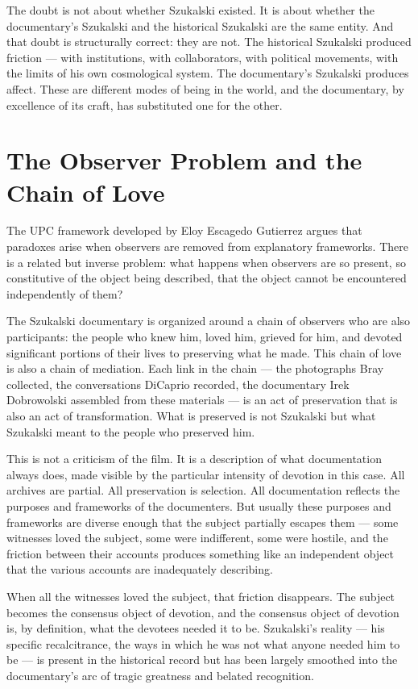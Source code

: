 \documentclass[11pt, a4paper]{article}
\theoremstyle{named}
\begin{document}
The doubt is not about whether Szukalski existed. It is about
whether the documentary's Szukalski and the historical Szukalski
are the same entity. And that doubt is structurally correct:
they are not. The historical Szukalski produced friction — with
institutions, with collaborators, with political movements, with
the limits of his own cosmological system. The documentary's Szukalski
produces affect. These are different modes of being in the world,
and the documentary, by excellence of its craft, has substituted one
for the other.

\section{The Observer Problem and the Chain of Love}

The UPC framework developed by Eloy Escagedo Gutierrez argues that
paradoxes arise when observers are removed from explanatory
frameworks. There is a related but inverse problem: what happens when
observers are so present, so constitutive of the object being
described, that the object cannot be encountered independently of
them?

The Szukalski documentary is organized around a chain of observers
who are also participants: the people who knew him, loved him, grieved
for him, and devoted significant portions of their lives to preserving
what he made. This chain of love is also a chain of mediation. Each
link in the chain — the photographs Bray collected, the conversations
DiCaprio recorded, the documentary Irek Dobrowolski assembled from
these materials — is an act of preservation that is also an act of
transformation. What is preserved is not Szukalski but what Szukalski
meant to the people who preserved him.

This is not a criticism of the film. It is a description of what
documentation always does, made visible by the particular intensity
of devotion in this case. All archives are partial. All preservation
is selection. All documentation reflects the purposes and frameworks
of the documenters. But usually these purposes and frameworks are
diverse enough that the subject partially escapes them — some witnesses
loved the subject, some were indifferent, some were hostile, and the
friction between their accounts produces something like an independent
object that the various accounts are inadequately describing.

When all the witnesses loved the subject, that friction disappears.
The subject becomes the consensus object of devotion, and the
consensus object of devotion is, by definition, what the devotees
needed it to be. Szukalski's reality — his specific recalcitrance,
the ways in which he was not what anyone needed him to be — is
present in the historical record but has been largely smoothed into
the documentary's arc of tragic greatness and belated recognition.
\end{document}

